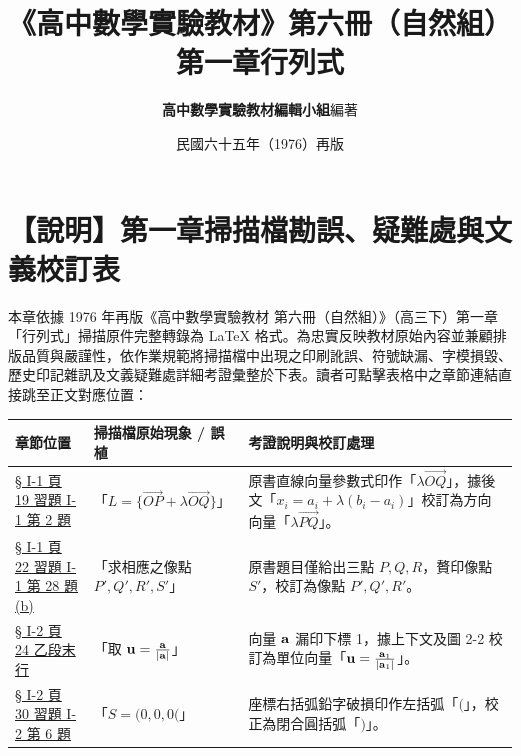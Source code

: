 \documentclass[a4paper,12pt,twoside]{article}
\title{\LARGE\textbf{《高中數學實驗教材》第六冊（自然組）}\\[0.5em] \Large\textbf{第一章\quad 行列式}}
\author{\textbf{高中數學實驗教材編輯小組}\quad 編著}
\date{民國六十五年（1976）再版}
\begin{document}
\maketitle
\thispagestyle{firstpage}

\section*{【說明】第一章掃描檔勘誤、疑難處與文義校訂表}
\label{sec:errata_notes_b6_ch1}
\label{sec:current_errata}

本章依據 1976 年再版《高中數學實驗教材 第六冊（自然組）》（高三下）第一章「行列式」掃描原件完整轉錄為 \LaTeX{} 格式。為忠實反映教材原始內容並兼顧排版品質與嚴謹性，依作業規範將掃描檔中出現之印刷訛誤、符號缺漏、字模損毀、歷史印記雜訊及文義疑難處詳細考證彙整於下表。讀者可點擊表格中之章節連結直接跳至正文對應位置：

\begin{table}[H]
\centering
\small
\renewcommand{\arraystretch}{1.35}
\begin{tabularx}{\textwidth}{|p{3.2cm}|p{3.8cm}|X|}
\hline
\textbf{章節位置} & \textbf{掃描檔原始現象 / 誤植} & \textbf{考證說明與校訂處理} \\ \hline

\hyperref[note:b6-ch1-p19-l-eq]{§ I-1 頁 19 習題 I-1 第 2 題} & 
「$L = \{ \vec{OP} + \lambda\vec{OQ} \}$」 & 
原書直線向量參數式印作「$\lambda\vec{OQ}$」，據後文「$x_i = a_i + \lambda(b_i - a_i)$」校訂為方向向量「$\lambda\vec{PQ}$」。 \\ \hline

\hyperref[note:b6-ch1-p22-ex28-s]{§ I-1 頁 22 習題 I-1 第 28 題 (b)} & 
「求相應之像點 $P', Q', R', S'$」 & 
原書題目僅給出三點 $P, Q, R$，贅印像點 $S'$，校訂為像點 $P', Q', R'$。 \\ \hline

\hyperref[note:b6-ch1-p24-u]{§ I-2 頁 24 乙段末行} & 
「取 $\boldsymbol{\mathbf{u}}=\frac{\boldsymbol{\mathbf{a}}}{|\boldsymbol{\mathbf{a}}|}$」 & 
向量 $\boldsymbol{\mathbf{a}}$ 漏印下標 1，據上下文及圖 2-2 校訂為單位向量「$\boldsymbol{\mathbf{u}}=\frac{\boldsymbol{\mathbf{a}}_1}{|\boldsymbol{\mathbf{a}}_1|}$」。 \\ \hline

\hyperref[note:b6-ch1-p30-s-coord]{§ I-2 頁 30 習題 I-2 第 6 題} & 
「$S=(0,0,0($」 & 
座標右括弧鉛字破損印作左括弧「$($」，校正為閉合圓括弧「$)$」。 \\ \hline

\end{tabularx}
\end{table}

\newpage
\renewcommand{\contentsname}{目\qquad 次}
\tableofcontents
\newpage


\end{document}
